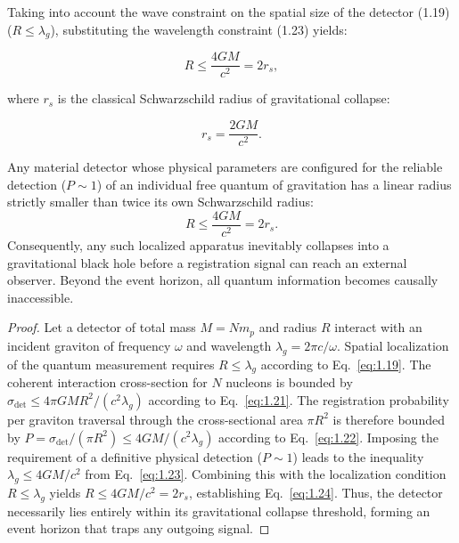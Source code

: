 Taking into account the wave constraint on the spatial size of the detector (1.19) ($R \le \lambda_g$), substituting the wavelength constraint (1.23) yields:

\begin{equation}\label{eq:1.24}\tag{1.24}
R \le \frac{4 G M}{c^2} = 2 r_s,
\end{equation}

where $r_s$ is the classical Schwarzschild radius of gravitational collapse:

\begin{equation}\label{eq:1.25}\tag{1.25}
r_s = \frac{2GM}{c^2}.
\end{equation}

\begin{theorem}\label{thm:dyson}
Any material detector whose physical parameters are configured for the reliable detection ($P \sim 1$) of an individual free quantum of gravitation has a linear radius strictly smaller than twice its own Schwarzschild radius:
\begin{equation*}
R \le \frac{4GM}{c^2} = 2 r_s.
\end{equation*}
Consequently, any such localized apparatus inevitably collapses into a gravitational black hole before a registration signal can reach an external observer. Beyond the event horizon, all quantum information becomes causally inaccessible.
\end{theorem}

\begin{proof}
Let a detector of total mass $M = N m_p$ and radius $R$ interact with an incident graviton of frequency $\omega$ and wavelength $\lambda_g = 2\pi c / \omega$. Spatial localization of the quantum measurement requires $R \le \lambda_g$ according to Eq.~\eqref{eq:1.19}. The coherent interaction cross-section for $N$ nucleons is bounded by $\sigma_{\text{det}} \le 4\pi G M R^2 / (c^2 \lambda_g)$ according to Eq.~\eqref{eq:1.21}. The registration probability per graviton traversal through the cross-sectional area $\pi R^2$ is therefore bounded by $P = \sigma_{\text{det}} / (\pi R^2) \le 4 G M / (c^2 \lambda_g)$ according to Eq.~\eqref{eq:1.22}. Imposing the requirement of a definitive physical detection ($P \sim 1$) leads to the inequality $\lambda_g \le 4GM / c^2$ from Eq.~\eqref{eq:1.23}. Combining this with the localization condition $R \le \lambda_g$ yields $R \le 4GM/c^2 = 2r_s$, establishing Eq.~\eqref{eq:1.24}. Thus, the detector necessarily lies entirely within its gravitational collapse threshold, forming an event horizon that traps any outgoing signal.
\end{proof}

